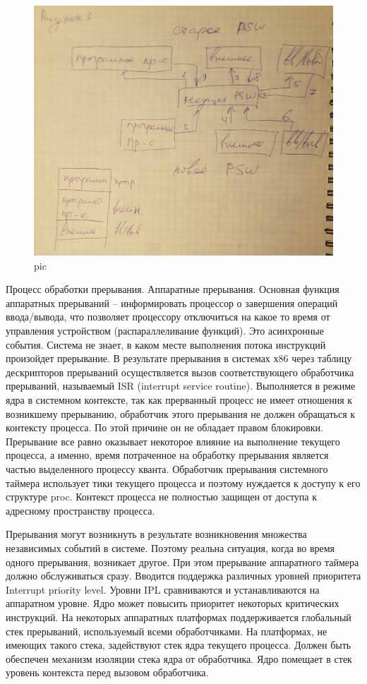 \begin{figure}[H]
    \centering
    \includegraphics[width=\textwidth]{pic/3.png}
    \caption{pic}
\end{figure}

Процесс обработки прерывания. Аппаратные прерывания. Основная функция аппаратных прерываний – информировать процессор о завершения операций ввода/вывода, что позволяет процессору отключиться на какое то время от управления устройством (распараллеливание функций). Это асинхронные события. Система не знает, в каком месте выполнения потока инструкций произойдет прерывание. В результате прерывания в системах х86 через таблицу дескрипторов прерываний осуществляется вызов соответствующего обработчика прерываний, называемый ISR (interrupt service routine). Выполняется в режиме ядра в системном контексте, так как прерванный процесс не имеет отношения к возникшему прерыванию, обработчик этого прерывания не должен обращаться к контексту процесса. По этой причине он не обладает правом блокировки. Прерывание все равно оказывает некоторое влияние на выполнение текущего процесса, а именно, время потраченное на обработку прерывания является частью выделенного процессу кванта. Обработчик прерывания системного таймера использует тики текущего процесса и поэтому нуждается к доступу к его структуре proc. Контекст процесса не полностью защищен от доступа к адресному пространству процесса. 

Прерывания могут возникнуть в результате возникновения множества независимых событий в системе. Поэтому реальна ситуация, когда во время одного прерывания, возникает другое. При этом прерывание аппаратного таймера должно обслуживаться сразу. Вводится поддержка различных уровней приоритета Interrupt priority level. Уровни IPL сравниваются и устанавливаются на аппаратном уровне. Ядро может повысить приоритет некоторых критических инструкций. На некоторых аппаратных платформах поддерживается глобальный стек прерываний, используемый всеми обработчиками. На платформах, не имеющих такого стека, задействуют стек ядра текущего процесса. Должен быть обеспечен механизм изоляции стека ядра от обработчика. Ядро помещает в стек уровень контекста перед вызовом обработчика. 

